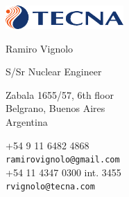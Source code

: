 \documentclass{article}
\begin{document}
\AddToShipoutPicture{\BackgroundPic}


\vspace{0.5cm plus \chico minus \chico}

\begin{minipage}{0.3\linewidth}
\par\vspace{\chico}
\par\vspace{\chico}
\par\vspace{\chico}
\vspace{1cm}
\end{minipage}
\begin{minipage}{0.4\linewidth}

\begin{center}
\href{http://www.tecna.com}{\includegraphics[width=4.5cm]{logos/logo-tecna}}\\

\smallskip

\textsf{Ramiro Vignolo}
\par
\textsf{S/Sr Nuclear Engineer}
\end{center}

\smallskip

\hspace{1.25cm}
\begin{minipage}{7cm}
Zabala 1655/57, 6th floor\\
Belgrano, Buenos Aires\\
Argentina
\end{minipage}

\begin{center}
+54 9 11 6482 4868\\
\textcolor{azul}{\texttt{ramirovignolo@gmail.com}}\\

+54 11 4347 0300 int. 3455\\
\textcolor{azul}{\texttt{rvignolo@tecna.com}}

\end{center}
\end{minipage}
\end{document}
